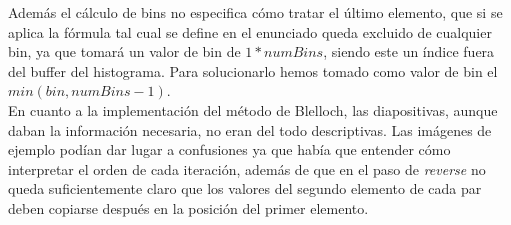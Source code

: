 \documentclass[10pt,oneside,a4paper]{article}
\begin{document}
Además el cálculo de bins no especifica cómo tratar el último elemento, que si se aplica la fórmula tal cual se define en el enunciado queda excluido de cualquier bin, ya que tomará un valor de bin de $1 * numBins$, siendo este un índice fuera del buffer del histograma. Para solucionarlo hemos tomado como valor de bin el $min(bin, numBins-1)$.\\

En cuanto a la implementación del método de Blelloch, las diapositivas, aunque daban la información necesaria, no eran del todo descriptivas. Las imágenes de ejemplo podían dar lugar a confusiones ya que había que entender cómo interpretar el orden de cada iteración, además de que en el paso de \emph{reverse} no queda suficientemente claro que los valores del segundo elemento de cada par deben copiarse después en la posición del primer elemento.
\end{document}
